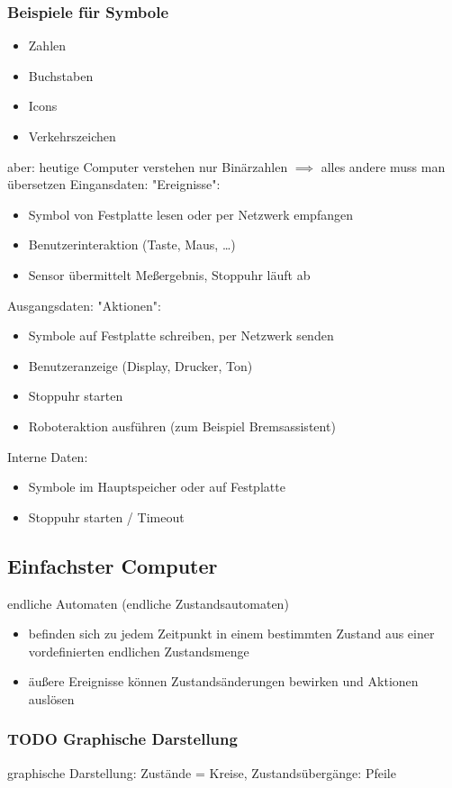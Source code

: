 \documentclass[a4paper]{scrartcl}
\theoremstyle{definition}
\theoremstyle{plain}
\theoremstyle{remark}
\theoremstyle{remark}
\begin{document}
\subsubsection{Beispiele für Symbole}
\label{sec-3-2-1}
\begin{itemize}
\item Zahlen
\item Buchstaben
\item Icons
\item Verkehrszeichen
\end{itemize}
aber: heutige Computer verstehen nur Binärzahlen $\implies$ alles andere muss man übersetzen
Eingansdaten: "Ereignisse":
\begin{itemize}
\item Symbol von Festplatte lesen oder per Netzwerk empfangen
\item Benutzerinteraktion (Taste, Maus, \ldots{})
\item Sensor übermittelt Meßergebnis, Stoppuhr läuft ab
\end{itemize}
Ausgangsdaten: "Aktionen":
\begin{itemize}
\item Symbole auf Festplatte schreiben, per Netzwerk senden
\item Benutzeranzeige (Display, Drucker, Ton)
\item Stoppuhr starten
\item Roboteraktion ausführen (zum Beispiel Bremsassistent)
\end{itemize}
Interne Daten:
\begin{itemize}
\item Symbole im Hauptspeicher oder auf Festplatte
\item Stoppuhr starten / Timeout
\end{itemize}
\subsection{Einfachster Computer}
\label{sec-3-3}
endliche Automaten (endliche Zustandsautomaten)
\begin{itemize}
\item befinden sich zu jedem Zeitpunkt in einem bestimmten Zustand aus einer vordefinierten endlichen Zustandsmenge
\item äußere Ereignisse können Zustandsänderungen bewirken und Aktionen auslösen
\end{itemize}
\subsubsection{{\bfseries\sffamily TODO} Graphische Darstellung}
\label{sec-3-3-1}
graphische Darstellung: Zustände = Kreise, Zustandsübergänge: Pfeile
\end{document}

